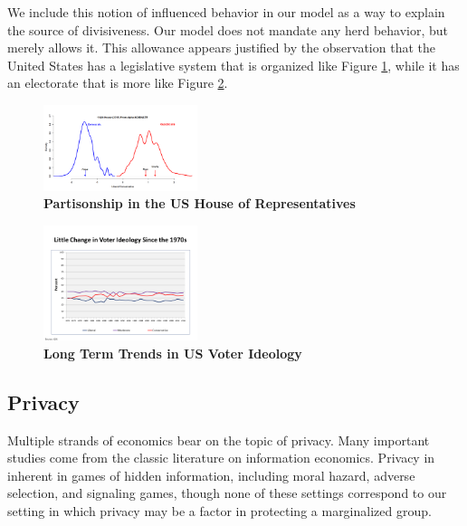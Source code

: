 We include this notion of influenced behavior in our model as a way to explain the source of divisiveness.  Our model does not mandate any herd behavior, but merely allows it.  This allowance appears justified by the observation that the United States has a legislative system that is organized like Figure \ref{fig:partisonship}, while it has an electorate that is more like Figure \ref{fig:voters}.


\begin{figure}[htbp]
\begin{center}
\includegraphics[width=0.4\textwidth]{figs/alpha_House_114_Histogram_8_January_2016}
\caption{{\bf Partisonship in the US House of Representatives}}
\label{fig:partisonship}
\end{center}
\end{figure}




\begin{figure}[htbp]
\begin{center}
\includegraphics[width=0.4\textwidth]{figs/polarization2}
\caption{{\bf Long Term Trends in US Voter Ideology}}
\label{fig:voters}
\end{center}
\end{figure}


\subsection{Privacy}

Multiple strands of economics bear on the topic of privacy.  Many important studies come from the classic literature on information economics.  Privacy in inherent in games of hidden information, including moral hazard, adverse selection, and signaling games, though none of these settings correspond to our setting in which privacy may be a factor in protecting a marginalized group.

